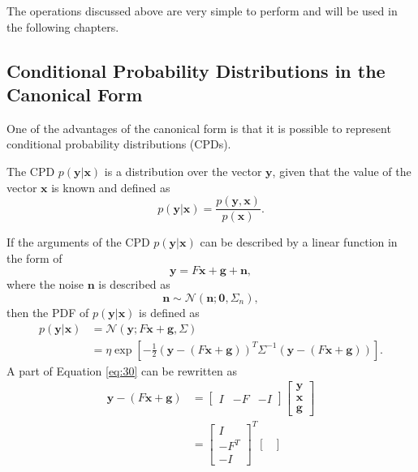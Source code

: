 \documentclass[12pt,oneside,openany,a4paper, %
afrikaans,english,
]{memoir}
\numberwithin{equation}{chapter}
\begin{document}
{The operations discussed above are very simple to perform and will be used in the following chapters.
\subsection{Conditional Probability Distributions in the Canonical Form}
One of the advantages of the canonical form is that it is possible to represent conditional probability distributions (CPDs).

The CPD $p(\bm{y}|\bm{x})$ is a distribution over the vector $\bm{y}$, given that the value of the vector $\bm{x}$ is known and  defined as
\begin{equation}
p(\bm{y}|\bm{x}) = \frac{p(\bm{y},\bm{x})}{p(\bm{x})}.
\end{equation}

If the arguments of the CPD $p(\bm{y}|\bm{x})$ can be described by a linear function in the form of
\begin{equation}
\bm{y} = F\bm{x} + \bm{g} + \bm{n},
\end{equation}
where the noise $\bm{n}$ is described as
\begin{equation}
\bm{n} \sim \mathcal{N}(\bm{n}; \bm{0}, \Sigma_n),
\end{equation}
then the PDF of $p(\bm{y}|\bm{x})$ is defined as 
\begin{equation}
\label{eq:30}
\begin{split}
p(\bm{y}|\bm{x}) & = \mathcal{N}(\bm{y}; F\bm{x} + \bm{g}, \Sigma) \\
& = \eta\exp\left[-\frac{1}{2}(\bm{y} - (F\bm{x} + \bm{g}))^T\Sigma^{-1}(\bm{y}-(F\bm{x} + \bm{g}))\right].
\end{split}
\end{equation}
A part of Equation \ref{eq:30} can be rewritten as 
\begin{equation}\label{eq: rewrite}
\begin{split}
\bm{y} - (F\bm{x} + \bm{g}) & =
\begin{bmatrix}
I&-F&-I
\end{bmatrix}
\begin{bmatrix}
\bm{y}\\
\bm{x}\\
\bm{g}
\end{bmatrix}\\
& =
\begin{bmatrix}
I\\-F^T\\-I
\end{bmatrix}^T
\begin{bmatrix}

\end{bmatrix}
\end{split}
\end{equation}}
\end{document}
